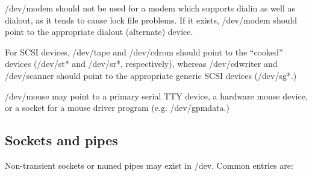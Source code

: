 \begin{nodelist}
\end{nodelist}

\noindent
{\file /dev/modem} should not be used for a modem which supports
dialin as well as dialout, as it tends to cause lock file problems.
If it exists, {\file /dev/modem} should point to the appropriate
dialout (alternate) device.

For SCSI devices, {\file /dev/tape} and {\file /dev/cdrom} should
point to the ``cooked'' devices ({\file /dev/st*} and {\file
/dev/sr*}, respectively), whereas {\file /dev/cdwriter} and {\file
/dev/scanner} should point to the appropriate generic SCSI devices
({\file /dev/sg*}.)

{\file /dev/mouse} may point to a primary serial TTY device, a
hardware mouse device, or a socket for a mouse driver program
(e.g. {\file /dev/gpmdata}.)

\subsection{Sockets and pipes}

Non-transient sockets or named pipes may exist in {\file /dev}.
Common entries are:

\begin{nodelist}
\end{nodelist}



